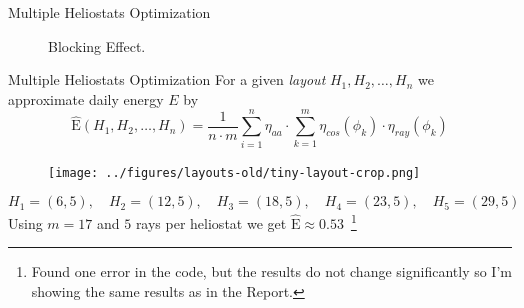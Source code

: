 \documentclass[10pt, xcolor={dvipsnames}]{beamer}
\begin{document}
\begin{frame}{Multiple Heliostats Optimization}
\begin{minipage}[t]{0.5\textwidth}
\begin{center}
\begin{figure}
\caption{Blocking Effect.}
\end{figure}
\end{center}
\end{minipage}
\end{frame}

\begin{frame}{Multiple Heliostats Optimization}
For a given {\it layout} $H_{1}, H_{2}, \dots, H_{n}$ we approximate daily energy $E$ by
\begin{equation}
\widehat{\text{E}}(H_{1}, H_{2}, \dots, H_{n}) = 
\frac{1}{n\cdot m}
\sum_{i = 1}^{n} \eta_{aa} \cdot
\sum_{k = 1}^{m} \eta_{cos}(\phi_{k}) \cdot 
\eta_{ray}(\phi_{k})
\end{equation}
\vspace{-.4cm}
\begin{center}
\begin{figure}
\texttt{[image: ../figures/layouts-old/tiny-layout-crop.png]}
\end{figure}
\end{center}
\vspace{-0.4cm}
\begin{example}
$$
H_1 = (6, 5), \quad 
H_2 = (12, 5), \quad
H_3 = (18, 5), \quad
H_4 = (23, 5), \quad
H_5 = (29, 5)
$$
Using $m = 17$ and $5$ rays per heliostat we get $\widehat{\text{E}} \approx 0.53$~\footnote{Found one error in the code, but the results do not change significantly so I'm showing the same results as in the Report.}
\end{example}
\end{frame}
\end{document}
